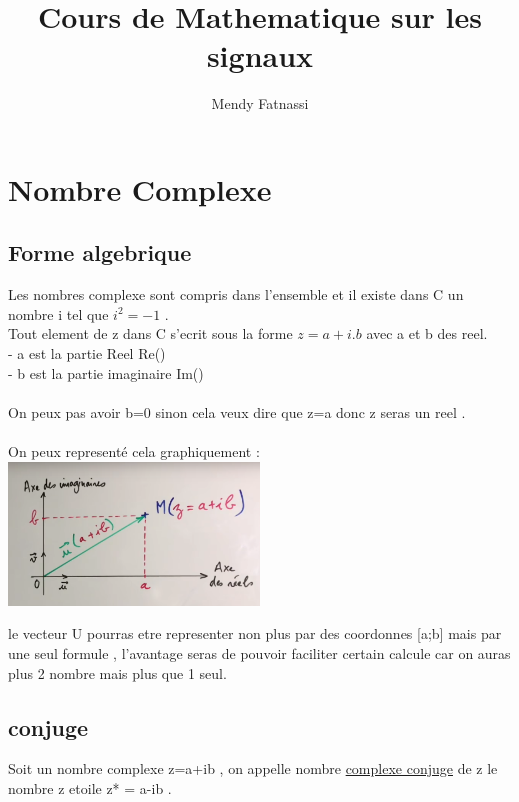 \documentclass[a4paper,8pt,openany]{book}
\author{Mendy Fatnassi}
\title{Cours de Mathematique sur les signaux}
\begin{document}
\maketitle
\tableofcontents

\chapter{Nombre Complexe}

\section{Forme algebrique}

Les nombres complexe sont compris dans l'ensemble  et il existe dans C un nombre i tel que $i^2 = -1$ .\\
Tout element de z dans C s'ecrit sous la forme $z=a+i.b$ avec a et b des reel.\\
- a est la partie Reel Re() \\
- b est la partie imaginaire Im() \\
\\
On peux pas avoir b=0 sinon cela veux dire que z=a donc z seras un reel .\\
\\
On peux representé cela graphiquement : \\

\includegraphics[width=0.5\textwidth , center]{img/NbComplexeAffixe.png}

le vecteur U pourras etre representer non plus par des coordonnes [a;b] mais par une seul formule , l'avantage seras de pouvoir faciliter certain calcule car on auras plus 2 nombre mais plus que 1 seul.\\ 

\section{conjuge}

Soit un nombre complexe z=a+ib , on appelle nombre \underline{complexe conjuge} de z le nombre z etoile z* = a-ib .\\
\end{document}
